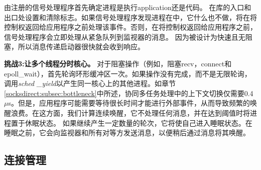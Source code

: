 由\libipc {}注册的信号处理程序首先确定进程是执行application还是\libipc {}代码。 \libipc {}在库的入口和出口处设置和清除标志。如果信号处理程序发现进程在\libipc 中，它什么也不做，\libipc {}将在将控制权返回给应用程序之前处理该事件。否则，在将控制权返回给应用程序之前，信号处理程序会立即处理从紧急队列到监视器的消息。
因为\libipc {}被设计为快速且无阻塞，所以消息传递启动器很快就会收到响应。

\textbf {挑战3:让多个线程分时核心。}
对于阻塞操作（例如，阻塞recv，connect和epoll\_wait），\libipc {}首先轮询环形缓冲区一次。如果操作没有完成，而不是无限轮询，\libipc {}调用\textit {sched \_yield}以产生同一核心上的其他进程。如章节 \ref {socksdirect:subsec:bottleneck}中所述，协同多任务处理中的上下文切换仅需要0.4~$\mu$s。但是，应用程序可能需要等待很长时间才能进行外部事件，从而导致频繁的唤醒浪费。在这方面，我们计算连续唤醒，它不处理任何消息，并在达到阈值时将进程置于休眠状态。
如果\libipc {}继续产生一定数量的轮次，它将使自己进入睡眠状态。在睡眠之前，它会向监视器和所有对等方发送消息，以便稍后通过消息将其唤醒。




\subsection{连接管理}
\label{socksdirect:subsec:connection-management}


